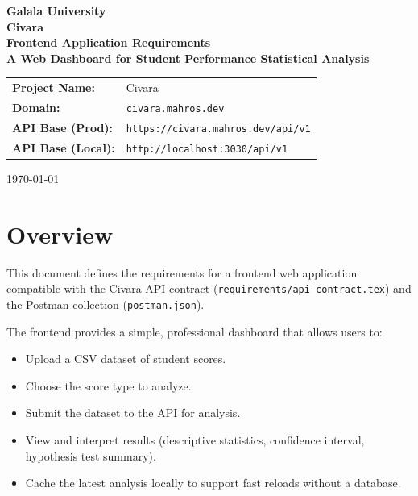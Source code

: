 \documentclass[12pt,a4paper]{article}
\begin{document}
\begin{titlepage}
    \centering

    \vspace*{1.5cm}

    {\Large \textbf{Galala University}}\\[1.5cm]

    {\LARGE \textbf{Civara}}\\[0.4cm]

    {\Large \textbf{Frontend Application Requirements}}\\[0.5cm]

    {\large \textbf{A Web Dashboard for Student Performance Statistical Analysis}}\\[2cm]

    \begin{table}[h!]
        \centering
        \renewcommand{\arraystretch}{1.4}
        \begin{tabular}{>{\bfseries}l l}
            Project Name: & Civara \\
            Domain: & \texttt{civara.mahros.dev} \\
            API Base (Prod): & \texttt{https://civara.mahros.dev/api/v1} \\
            API Base (Local): & \texttt{http://localhost:3030/api/v1} \\
        \end{tabular}
    \end{table}

    \vfill

    {\large \today}
\end{titlepage}


\section{Overview}

This document defines the requirements for a frontend web application compatible with the Civara API contract (\texttt{requirements/api-contract.tex}) and the Postman collection (\texttt{postman.json}).

The frontend provides a simple, professional dashboard that allows users to:
\begin{itemize}
    \item Upload a CSV dataset of student scores.
    \item Choose the score type to analyze.
    \item Submit the dataset to the API for analysis.
    \item View and interpret results (descriptive statistics, confidence interval, hypothesis test summary).
    \item Cache the latest analysis locally to support fast reloads without a database.
\end{itemize}
\end{document}
